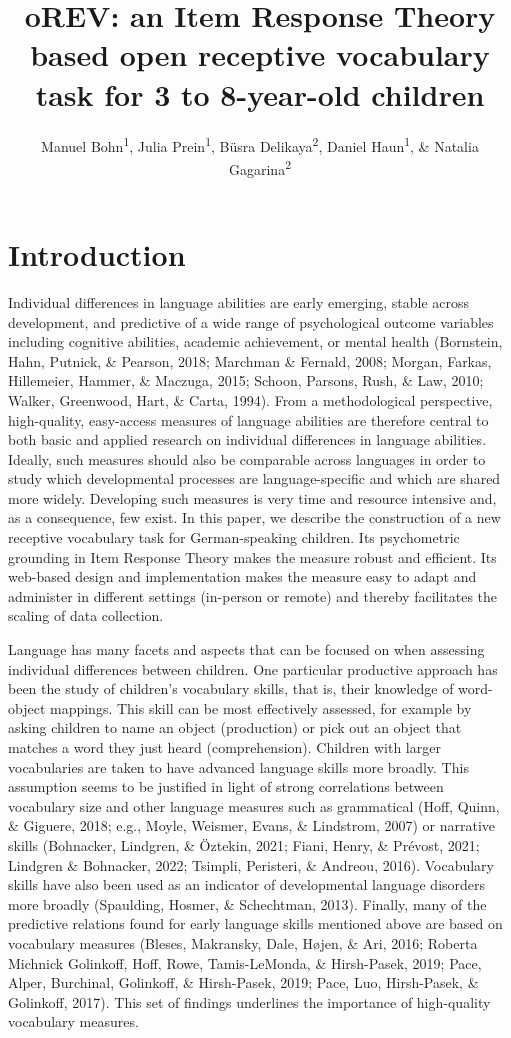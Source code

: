 \documentclass[
  man,floatsintext]{apa6}
\title{oREV: an Item Response Theory based open receptive vocabulary task for 3 to 8-year-old children}
\author{Manuel Bohn\textsuperscript{1}, Julia Prein\textsuperscript{1}, Büsra Delikaya\textsuperscript{2}, Daniel Haun\textsuperscript{1}, \& Natalia Gagarina\textsuperscript{2}}
\date{}
\affiliation{\vspace{0.5cm}\textsuperscript{1} Department of Comparative Cultural Psychology, Max Planck Institute for Evolutionary Anthropology, Leipzig, Germany\\\textsuperscript{2} Leibniz-Zentrum Allgemeine Sprachwissenschaft, Berlin, Germany}
\begin{document}
\maketitle

\hypertarget{introduction}{%
\section{Introduction}\label{introduction}}

Individual differences in language abilities are early emerging, stable across development, and predictive of a wide range of psychological outcome variables including cognitive abilities, academic achievement, or mental health (Bornstein, Hahn, Putnick, \& Pearson, 2018; Marchman \& Fernald, 2008; Morgan, Farkas, Hillemeier, Hammer, \& Maczuga, 2015; Schoon, Parsons, Rush, \& Law, 2010; Walker, Greenwood, Hart, \& Carta, 1994). From a methodological perspective, high-quality, easy-access measures of language abilities are therefore central to both basic and applied research on individual differences in language abilities. Ideally, such measures should also be comparable across languages in order to study which developmental processes are language-specific and which are shared more widely. Developing such measures is very time and resource intensive and, as a consequence, few exist. In this paper, we describe the construction of a new receptive vocabulary task for German-speaking children. Its psychometric grounding in Item Response Theory makes the measure robust and efficient. Its web-based design and implementation makes the measure easy to adapt and administer in different settings (in-person or remote) and thereby facilitates the scaling of data collection.

Language has many facets and aspects that can be focused on when assessing individual differences between children. One particular productive approach has been the study of children's vocabulary skills, that is, their knowledge of word-object mappings. This skill can be most effectively assessed, for example by asking children to name an object (production) or pick out an object that matches a word they just heard (comprehension). Children with larger vocabularies are taken to have advanced language skills more broadly. This assumption seems to be justified in light of strong correlations between vocabulary size and other language measures such as grammatical (Hoff, Quinn, \& Giguere, 2018; e.g., Moyle, Weismer, Evans, \& Lindstrom, 2007) or narrative skills (Bohnacker, Lindgren, \& Öztekin, 2021; Fiani, Henry, \& Prévost, 2021; Lindgren \& Bohnacker, 2022; Tsimpli, Peristeri, \& Andreou, 2016). Vocabulary skills have also been used as an indicator of developmental language disorders more broadly (Spaulding, Hosmer, \& Schechtman, 2013). Finally, many of the predictive relations found for early language skills mentioned above are based on vocabulary measures (Bleses, Makransky, Dale, Højen, \& Ari, 2016; Roberta Michnick Golinkoff, Hoff, Rowe, Tamis-LeMonda, \& Hirsh-Pasek, 2019; Pace, Alper, Burchinal, Golinkoff, \& Hirsh-Pasek, 2019; Pace, Luo, Hirsh-Pasek, \& Golinkoff, 2017). This set of findings underlines the importance of high-quality vocabulary measures.
\end{document}
